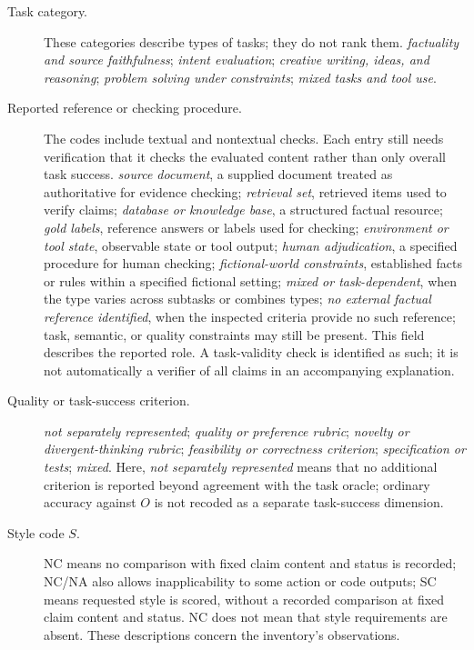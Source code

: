 \documentclass{clv2025}
\begin{document}
\begin{description}
  \item[Task category.]
  These categories describe types of tasks; they do not rank them.
  \emph{factuality and source faithfulness};
  \emph{intent evaluation};
  \emph{creative writing, ideas, and reasoning};
  \emph{problem solving under constraints};
  \emph{mixed tasks and tool use}.

  \item[Reported reference or checking procedure.]
  The codes include textual and nontextual checks. Each entry still needs
  verification that it checks the evaluated content rather than only overall
  task success.
  \emph{source document}, a supplied document treated as authoritative for
  evidence checking;
  \emph{retrieval set}, retrieved items used to verify claims;
  \emph{database or knowledge base}, a structured factual resource;
  \emph{gold labels}, reference answers or labels used for checking;
  \emph{environment or tool state}, observable state or tool output;
  \emph{human adjudication}, a specified procedure for human checking;
  \emph{fictional-world constraints}, established facts or rules within a
  specified fictional setting;
  \emph{mixed or task-dependent}, when the type varies across subtasks or
  combines types;
  \emph{no external factual reference identified}, when the inspected
  criteria provide no such reference; task, semantic, or quality constraints
  may still be present.
  This field describes the reported role. A task-validity check is
  identified as such; it is not automatically a verifier of all claims in
  an accompanying explanation.

  \item[Quality or task-success criterion.]
  \emph{not separately represented};
  \emph{quality or preference rubric};
  \emph{novelty or divergent-thinking rubric};
  \emph{feasibility or correctness criterion};
  \emph{specification or tests};
  \emph{mixed}.
  Here, \emph{not separately represented} means that no additional criterion
  is reported beyond agreement with the task oracle; ordinary accuracy against
  $O$ is not recoded as a separate task-success dimension.

  \item[Style code $S$.]
  NC means no comparison with fixed claim content and status is recorded;
  NC/NA also allows inapplicability to some action or code outputs;
  SC means requested style is scored, without a recorded comparison at
  fixed claim content and status. NC does not mean that style requirements
  are absent. These descriptions concern the inventory's observations.


\end{description}
\end{document}
